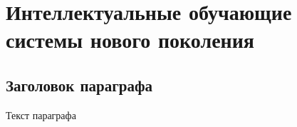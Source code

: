 
\chapter{Интеллектуальные обучающие системы нового поколения}
\label{chapter_learning_systems}


\section{Заголовок параграфа}
Текст параграфа

%
